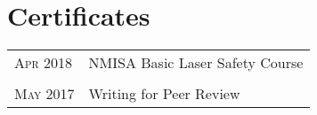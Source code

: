 \section{Certificates}

\begin{tabular}{p{1.8cm}|p{12cm}}
	\textsc{Apr} 2018 & NMISA Basic Laser Safety Course \\
	\multicolumn{2}{c}{} \\
	\textsc{May} 2017 & Writing for Peer Review
\end{tabular}